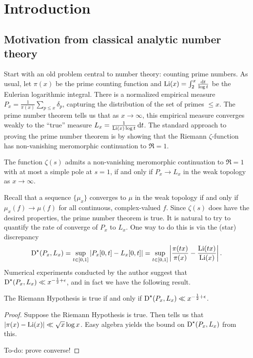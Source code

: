 
\chapter{Introduction}





\section{Motivation from classical analytic number theory}

Start with an old problem central to number theory: counting 
prime numbers. As usual, let $\pi(x)$ be the prime counting function and 
$\operatorname{Li}(x) = \int_2^x \frac{\mathrm{d} t}{\log t}$ be the Eulerian logarithmic integral. 
There is a normalized empirical measure 
$P_x = \frac{1}{\pi(x)} \sum_{p\leqslant x} \delta_{p}$, capturing the 
distribution of the set of primes $\leqslant x$. The prime number theorem 
tells us that as $x\to \infty$, this empirical measure converges weakly to the 
``true'' measure $L_x = \frac{1}{\operatorname{Li}(x)\log t}\, \mathrm{d} t$. The standard approach 
to proving the prime number theorem is by showing that the Riemann 
$\zeta$-function has non-vanishing meromorphic continuation to $\Re = 1$.

\begin{theorem}
The function $\zeta(s)$ admits a non-vanishing meromorphic continuation to 
$\Re = 1$ with at most a simple pole at $s=1$, if and only if 
$P_x \to L_x$ in the weak topology as $x\to \infty$. 
\end{theorem}

Recall that a sequence $\{\mu_x\}$ converges to $\mu$ in the weak topology if 
and only if $\mu_x(f) \to \mu(f)$ for all continuous, complex-valued $f$. 
Since $\zeta(s)$ does have the desired properties, the prime number 
theorem is true. It is natural to try to quantify the rate of converge of $P_x$ 
to $L_x$. One way to do this is via the (star) discrepancy 
\[
	\operatorname{D}^\star(P_x,L_x) 
		= \sup_{t\in [0,1]} \left| P_x[0,t] - L_x[0,t]\right|
		= \sup_{t\in [0,1]} \left| \frac{\pi(t x)}{\pi(x)} - \frac{\operatorname{Li}(t x)}{\operatorname{Li}(x)}\right| .
\]
Numerical experiments conducted by the author suggest that 
$\operatorname{D}^\star(P_x,L_x) \ll x^{-\frac 1 2+\epsilon}$, and in fact we have the 
following result. 

\begin{theorem}
The Riemann Hypothesis is true if and only if 
$\operatorname{D}^\star(P_x,L_x) \ll x^{-\frac 1 2+\epsilon}$. 
\end{theorem}
\begin{proof}
Suppose the Riemann Hypothesis is true. Then 
\cite[6.18]{rosser-schoenfeld-1976} tells us that 
$|\pi(x) - \operatorname{Li}(x)| \ll \sqrt{x} \log x$. Easy algebra yields the bound on 
$\operatorname{D}^\star(P_x,L_x)$ from this. 

To-do: prove converse!
\end{proof}

